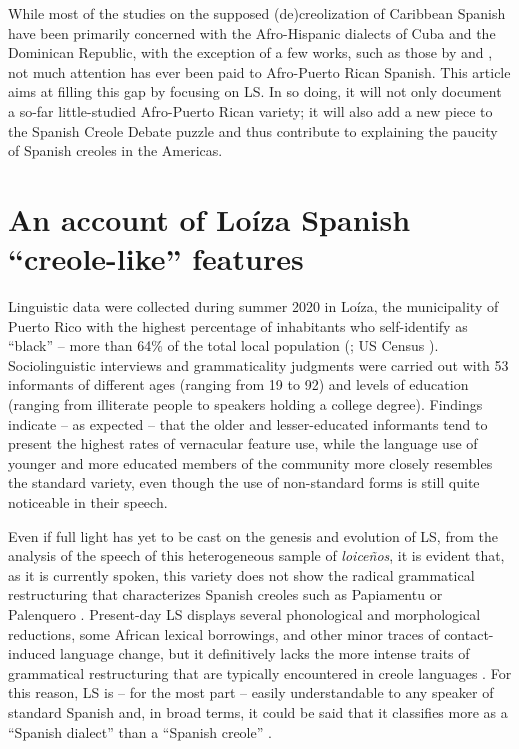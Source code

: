 \documentclass[output=paper,colorlinks,citecolor=brown]{langscibook}
\begin{document}
While most of the studies on the supposed (de)creolization of Caribbean Spanish have been primarily concerned with the Afro-Hispanic dialects of Cuba and the Dominican Republic, with the exception of a few works, such as those by \citet{Alvarez-Nazario1959,AlvarezNazario1974} and \citet{MauleónBenítez1974}, not much attention has ever been paid to Afro-Puerto Rican Spanish. This article aims at filling this gap by focusing on LS. In so doing, it will not only document a so-far little-studied Afro-Puerto Rican variety; it will also add a new piece to the Spanish Creole Debate puzzle and thus contribute to explaining the paucity of Spanish creoles in the Americas.

\section{An account of Loíza Spanish “creole-like” features} \label{sec:visconti:3}

Linguistic data were collected during summer 2020 in Loíza, the municipality of Puerto Rico with the highest percentage of inhabitants who self-identify as “black” -- more than 64\% of the total local population (\citealt{Moya2003}; US Census \citeyear{UScensus2010}). Sociolinguistic interviews and grammaticality judgments were carried out with 53 informants of different ages (ranging from 19 to 92) and levels of education (ranging from illiterate people to speakers holding a college degree). Findings indicate -- as expected -- that the older and lesser-educated informants tend to present the highest rates of vernacular feature use, while the language use of younger and more educated members of the community more closely resembles the standard variety, even though the use of non-standard forms is still quite noticeable in their speech.

Even if full light has yet to be cast on the genesis and evolution of LS, from the analysis of the speech of this heterogeneous sample of \textit{loiceños}, it is evident that, as it is currently spoken, this variety does not show the radical grammatical restructuring that characterizes Spanish creoles such as Papiamentu \citep{Jacobs2012} or Palenquero \citep{Schwegler1996}. Present-day LS displays several phonological and morphological reductions, some African lexical borrowings, and other minor traces of contact-induced language change, but it definitively lacks the more intense traits of grammatical restructuring that are typically encountered in creole languages \citep{winford2003book}. For this reason, LS is -- for the most part -- easily understandable to any speaker of standard Spanish and, in broad terms, it could be said that it classifies more as a “Spanish dialect” than a “Spanish creole” \citep[10]{McWhorter2000}. 
\end{document}
